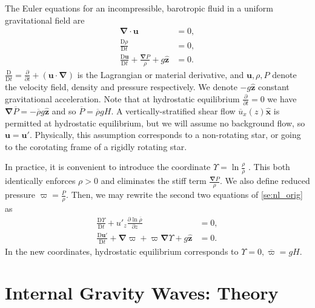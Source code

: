 \documentclass[
        fleqn,
        usenatbib,
    ]{mnras}
\newcommand*{\pd}[2]{\frac{\partial#1}{\partial#2}}
\newcommand*{\md}[2]{\frac{\mathrm{D}#1}{\mathrm{D}#2}}
\newcommand*{\p}[1]{\left(#1\right)}
\newcommand*{\bm}[1]{\boldsymbol{\mathbf{#1}}}
\newcommand*{\uv}[1]{\hat{\boldsymbol{\mathbf{#1}}}}
\begin{document}
The Euler equations for an incompressible, barotropic fluid in a uniform
gravitational field are
\begin{subequations}\label{se:nl_orig}
    \begin{align}
        \bm{\nabla} \cdot \bm{u} &= 0,\label{eq:nl_incomp}\\
        \md{\rho}{t} &= 0 ,\label{eq:nl_density}\\
        \md{\bm{u}}{t} + \frac{\bm{\nabla}P}{\rho} + g\uv{z} &=
            0\label{eq:nl_mom}.
    \end{align}
\end{subequations}
$\md{}{t} = \pd{}{t} + \p{\bm{u} \cdot \bm{\nabla}}$ is the Lagrangian or
material derivative, and $\bm{u}, \rho, P$ denote the velocity field, density
and pressure respectively. We denote $-g\uv{z}$ constant gravitational
acceleration. Note that at hydrostatic equilibrium $\pd{}{t} = 0$ we have
$\bm{\nabla}\overline{P} = -\overline{\rho} g\uv{z}$ and so $\overline{P} =
\overline{\rho} gH$. A vertically-stratified shear flow
$\overline{u}_x(z)\uv{x}$ is permitted at hydrostatic equilibrium, but we will
assume no background flow, so $\bm{u} = \bm{u}'$. Physically, this assumption
corresponds to a non-rotating star, or going to the corotating frame of a
rigidly rotating star.

In practice, it is convenient to introduce the coordinate $\Upsilon = \ln
\frac{\rho}{\overline{\rho}}$ \citep[e.g.][]{lecoanet_anel}. This both
identically enforces $\rho > 0$ and eliminates the stiff term
$\frac{\bm{\nabla}P}{\rho}$. We also define reduced pressure $\varpi =
\frac{P}{\rho}$. Then, we may rewrite the second two equations of
\autoref{se:nl_orig} as
\begin{subequations}\label{se:nl_upsilon}
    \begin{align}
        \md{\Upsilon}{t} + u'_z \pd{\ln \overline{\rho}}{z} &= 0
            ,\label{eq:nl_up_density} \\
        \md{\bm{u}'}{t} + \bm{\nabla}\varpi
            + \varpi\bm{\nabla}\Upsilon + g\uv{z} &= 0.
    \end{align}
\end{subequations}
In the new coordinates, hydrostatic equilibrium corresponds to $\Upsilon = 0,
\overline{\varpi} = gH$.

\section{Internal Gravity Waves: Theory}\label{s:theory}
\end{document}
